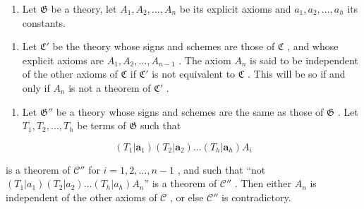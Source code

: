 \exercisegroup

\begin{enumerate}
\def\labelenumi{\arabic{enumi}.}
\tightlist
\item
  Let \(\mathfrak{G}\) be a theory, let \(A_{1}, A_{2}, \ldots, A_{n}\) be its explicit axioms and \(a_{1}, a_{2}, \ldots, a_{h}\) its constants.
\end{enumerate}

\begin{enumerate}
\def\labelenumi{(\alph{enumi})}
\tightlist
\item
  Let \(\mathfrak{C}'\) be the theory whose signs and schemes are those of \(\mathfrak{C}\) , and whose explicit axioms are \(A_1, A_2, \ldots, A_{n-1}\) . The axiom \(A_n\) is said to be independent of the other axioms of \(\mathfrak{C}\) if \(\mathfrak{C}'\) is not equivalent to \(\mathfrak{C}\) . This will be so if and only if \(A_n\) is not a theorem of \(\mathfrak{C}'\) .
\end{enumerate}

\begin{enumerate}
\def\labelenumi{(\alph{enumi})}
\setcounter{enumi}{1}
\tightlist
\item
  Let \(\mathfrak{G}''\) be a theory whose signs and schemes are the same as those of \(\mathfrak{G}\) . Let \(T_1, T_2, \ldots, T_h\) be terms of \(\mathfrak{G}\) such that
\end{enumerate}

\[
(T _ {1} | \boldsymbol {a} _ {1}) (T _ {2} | \boldsymbol {a} _ {2}) \dots (T _ {h} | \boldsymbol {a} _ {h}) A _ {i}
\]

is a theorem of \(\mathcal{C}''\) for \(i = 1, 2, \ldots, n - 1\) , and such that ``not \((T_1|a_1)(T_2|a_2) \ldots (T_h|a_h)A_n\)'' is a theorem of \(\mathcal{C}''\) . Then either \(A_n\) is independent of the other axioms of \(\mathcal{C}\) , or else \(\mathcal{C}''\) is contradictory.

